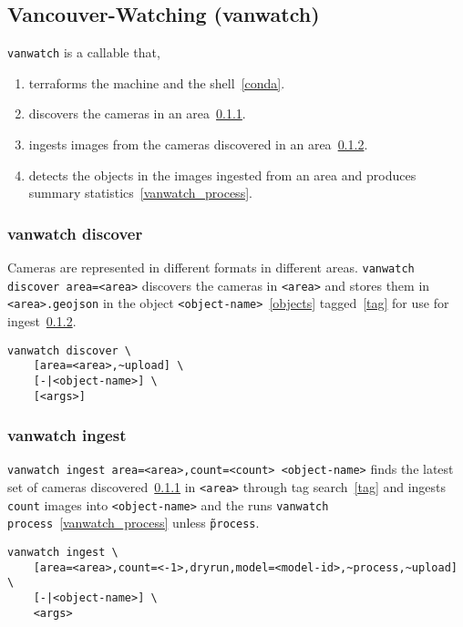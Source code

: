 \subsection{Vancouver-Watching (vanwatch)}
\label{vanwatch}

\texttt{vanwatch} is a callable that,
%
\begin{enumerate}
    \item{terraforms the machine and the shell~\ref{conda}.}
    \item{discovers the cameras in an area~\ref{vanwatch_discover}.}
    \item{ingests images from the cameras discovered in an area~\ref{vanwatch_ingest}.}
    \item{detects the objects in the images ingested from an area and produces summary statistics~\ref{vanwatch_process}.}
\end{enumerate}

\subsubsection{vanwatch discover}
\label{vanwatch_discover}

Cameras are represented in different formats in different areas. \texttt{vanwatch discover area=<area>} discovers the cameras in \texttt{<area>} and stores them in \texttt{<area>.geojson} in the object \texttt{<object-name>}~\ref{objects} tagged~\ref{tag} for use for ingest~\ref{vanwatch_ingest}.

\begin{verbatim}
vanwatch discover \
    [area=<area>,~upload] \
    [-|<object-name>] \
    [<args>]
\end{verbatim}

\subsubsection{vanwatch ingest}
\label{vanwatch_ingest}

\texttt{vanwatch ingest area=<area>,count=<count> <object-name>} finds the latest set of cameras discovered~\ref{vanwatch_discover} in \texttt{<area>} through tag search~\ref{tag} and ingests \texttt{count} images into \texttt{<object-name>} and the runs \texttt{vanwatch process}~\ref{vanwatch_process} unless \texttt{\~process}.

\begin{verbatim}
vanwatch ingest \
    [area=<area>,count=<-1>,dryrun,model=<model-id>,~process,~upload] \
    [-|<object-name>] \
    <args>
\end{verbatim}

